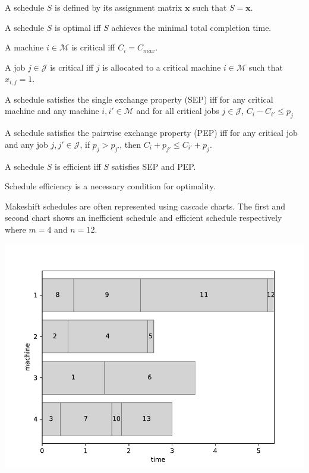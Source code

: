 \begin{definition}
	A schedule $S$ is defined by its assignment matrix $\mathbf{x}$ such that $S=\mathbf{x}$.
\end{definition}

\begin{definition}
	A schedule $S$ is optimal iff $S$ achieves the minimal total completion time.
\end{definition}


\begin{definition}
	A machine $i\in\mathcal{M}$ is critical iff $C_i=C_{max}$.
\end{definition}

\begin{definition}
	A job $j\in\mathcal{J}$ is critical iff $j$ is allocated to a critical machine $i\in\mathcal{M}$ such that $x_{i,j}=1$.
\end{definition}

\begin{definition}
	A schedule satisfies the single exchange property (SEP) iff for any critical machine and any machine $i,i'\in\mathcal{M}$ and for all critical jobs $j\in\mathcal{J}$, $C_i-C_{i'}\leq p_j$
\end{definition}

\begin{definition}
	A schedule satisfies the pairwise exchange property (PEP) iff for any critical job and any job $j,j'\in\mathcal{J}$, if $p_j>p_{j'}$, then $C_i+p_{j'}\leq C_{i'}+p_j$.
\end{definition}

\begin{definition}
	A schedule $S$ is efficient iff $S$ satisfies SEP and PEP.
\end{definition}

\begin{theorem}
	Schedule efficiency is a necessary condition for optimality.
\end{theorem}

Makeshift schedules are often represented using cascade charts. The first and second chart shows an inefficient schedule and efficient schedule respectively where $m=4$ and $n=12$.

\begin{center}
	\includegraphics[width=.6\linewidth]{figures/makeshift1.pdf}
\end{center}

